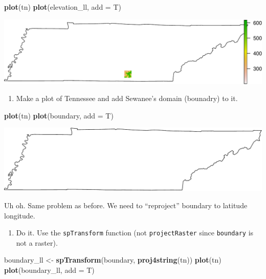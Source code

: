 \documentclass[
]{book}
\newenvironment{Shaded}{\begin{snugshade}}{\end{snugshade}}
\newcommand{\DataTypeTok}[1]{\textcolor[rgb]{0.13,0.29,0.53}{#1}}
\newcommand{\KeywordTok}[1]{\textcolor[rgb]{0.13,0.29,0.53}{\textbf{#1}}}
\newcommand{\NormalTok}[1]{#1}
\newcommand{\StringTok}[1]{\textcolor[rgb]{0.31,0.60,0.02}{#1}}
\providecommand{\tightlist}{%
  \setlength{\itemsep}{0pt}\setlength{\parskip}{0pt}}
\begin{document}
\begin{Shaded}
\begin{Highlighting}[]
\KeywordTok{plot}\NormalTok{(tn)}
\KeywordTok{plot}\NormalTok{(elevation_ll, }\DataTypeTok{add =}\NormalTok{ T)}
\end{Highlighting}
\end{Shaded}

\includegraphics{figures/unnamed-chunk-426-1.pdf}

\begin{enumerate}
\def\labelenumi{\arabic{enumi}.}
\setcounter{enumi}{19}
\tightlist
\item
  Make a plot of Tennessee and add Sewanee's domain (bounadry) to it.
\end{enumerate}

\begin{Shaded}
\begin{Highlighting}[]
\KeywordTok{plot}\NormalTok{(tn)}
\KeywordTok{plot}\NormalTok{(boundary, }\DataTypeTok{add =}\NormalTok{ T)}
\end{Highlighting}
\end{Shaded}

\includegraphics{figures/unnamed-chunk-427-1.pdf}

Uh oh. Same problem as before. We need to ``reproject'' boundary to latitude longitude.

\begin{enumerate}
\def\labelenumi{\arabic{enumi}.}
\setcounter{enumi}{20}
\tightlist
\item
  Do it. Use the \texttt{spTransform} function (not \texttt{projectRaster} since \texttt{boundary} is not a raster).
\end{enumerate}

\begin{Shaded}
\begin{Highlighting}[]
\NormalTok{boundary_ll <-}\StringTok{ }\KeywordTok{spTransform}\NormalTok{(boundary, }\KeywordTok{proj4string}\NormalTok{(tn))}
\KeywordTok{plot}\NormalTok{(tn)}
\KeywordTok{plot}\NormalTok{(boundary_ll, }\DataTypeTok{add =}\NormalTok{ T)}
\end{Highlighting}
\end{Shaded}
\end{document}
